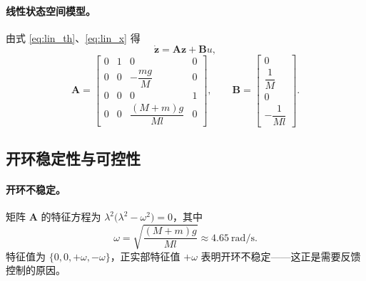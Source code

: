 \documentclass[11pt,a4paper]{article}
\begin{document}
\paragraph{线性状态空间模型。} 由式 \eqref{eq:lin_th}、\eqref{eq:lin_x} 得
\begin{equation}
    \dot{\mathbf z} = \mathbf A \mathbf z + \mathbf B u ,
\end{equation}
\begin{equation}
    \mathbf A =
    \begin{bmatrix}
        0 & 1 & 0 & 0 \\
        0 & 0 & -\dfrac{mg}{M} & 0 \\[0.4em]
        0 & 0 & 0 & 1 \\
        0 & 0 & \dfrac{(M+m)g}{M l} & 0
    \end{bmatrix},
    \qquad
    \mathbf B =
    \begin{bmatrix}
        0 \\ \dfrac{1}{M} \\ 0 \\ -\dfrac{1}{M l}
    \end{bmatrix}.
    \label{eq:AB}
\end{equation}

\subsection{开环稳定性与可控性}

\paragraph{开环不稳定。} 矩阵 $\mathbf A$ 的特征方程为 $\lambda^2\big(\lambda^2 - \omega^2\big) = 0$，其中
\begin{equation}
    \omega = \sqrt{\frac{(M+m)g}{Ml}} \approx 4.65\ \mathrm{rad/s} .
\end{equation}
特征值为 $\{0, 0, +\omega, -\omega\}$，正实部特征值 $+\omega$ 表明开环不稳定——这正是需要反馈控制的原因。
\end{document}
